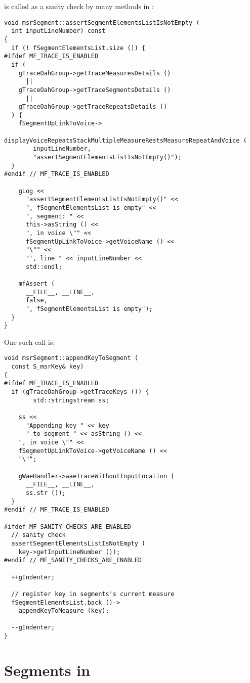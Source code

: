  is called as a sanity check by many methods in :
\begin{lstlisting}[language=CPlusPlus]
void msrSegment::assertSegmentElementsListIsNotEmpty (
  int inputLineNumber) const
{
  if (! fSegmentElementsList.size ()) {
#ifdef MF_TRACE_IS_ENABLED
  if (
    gTraceOahGroup->getTraceMeasuresDetails ()
      ||
    gTraceOahGroup->getTraceSegmentsDetails ()
      ||
    gTraceOahGroup->getTraceRepeatsDetails ()
  ) {
    fSegmentUpLinkToVoice->
      displayVoiceRepeatsStackMultipleMeasureRestsMeasureRepeatAndVoice (
        inputLineNumber,
        "assertSegmentElementsListIsNotEmpty()");
  }
#endif // MF_TRACE_IS_ENABLED

    gLog <<
      "assertSegmentElementsListIsNotEmpty()" <<
      ", fSegmentElementsList is empty" <<
      ", segment: " <<
      this->asString () <<
      ", in voice \"" <<
      fSegmentUpLinkToVoice->getVoiceName () <<
      "\"" <<
      "', line " << inputLineNumber <<
      std::endl;

    mfAssert (
      __FILE__, __LINE__,
      false,
      ", fSegmentElementsList is empty");
  }
}
\end{lstlisting}

One such call is:
\begin{lstlisting}[language=CPlusPlus]
void msrSegment::appendKeyToSegment (
  const S_msrKey& key)
{
#ifdef MF_TRACE_IS_ENABLED
  if (gTraceOahGroup->getTraceKeys ()) {
		std::stringstream ss;

    ss <<
      "Appending key " << key
      " to segment " << asString () <<
    ", in voice \"" <<
    fSegmentUpLinkToVoice->getVoiceName () <<
    "\"";

    gWaeHandler->waeTraceWithoutInputLocation (
      __FILE__, __LINE__,
      ss.str ());
  }
#endif // MF_TRACE_IS_ENABLED

#ifdef MF_SANITY_CHECKS_ARE_ENABLED
  // sanity check
  assertSegmentElementsListIsNotEmpty (
    key->getInputLineNumber ());
#endif // MF_SANITY_CHECKS_ARE_ENABLED

  ++gIndenter;

  // register key in segments's current measure
  fSegmentElementsList.back ()->
    appendKeyToMeasure (key);

  --gIndenter;
}
\end{lstlisting}


\section{Segments in \mxsrToMsr{}}

